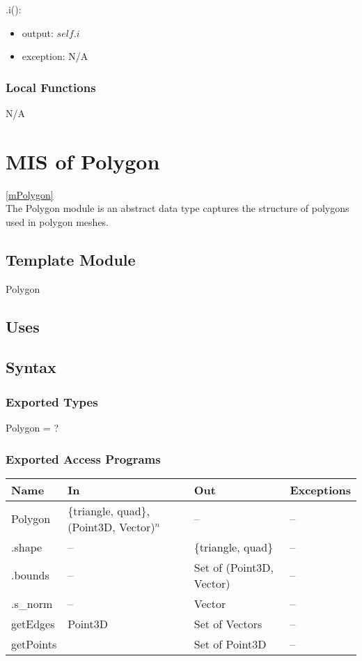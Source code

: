 \documentclass[12pt, titlepage]{article}
\begin{document}
\noindent .i():
\begin{itemize}
	\item output: $self.i$
	\item exception: N/A
\end{itemize}

\subsubsection{Local Functions}
N/A

\newpage

\section{MIS of Polygon} \ref{mPolygon} \\
The Polygon module is an abstract data type captures the structure of polygons 
used in polygon meshes.

\subsection{Template Module}
Polygon

\subsection{Uses}

\subsection{Syntax}
\subsubsection{Exported Types}
Polygon = ?
\subsubsection{Exported Access Programs}
\begin{center}
	\begin{tabular}{p{2cm} p{7cm} p{5cm} p{2cm}}
		\hline
		\textbf{Name} & \textbf{In} & \textbf{Out} & \textbf{Exceptions} \\
		\hline
		Polygon & \{triangle, quad\}, (Point3D, Vector)$^n$ & -- & -- \\
		.shape & -- & \{triangle, quad\} & -- \\
		.bounds & -- & Set of (Point3D, Vector) & -- \\
		.s\_norm & -- & Vector & -- \\
		getEdges & Point3D & Set of Vectors & -- \\
		getPoints & & Set of Point3D & -- \\
		\hline
	\end{tabular}
\end{center}
\end{document}

